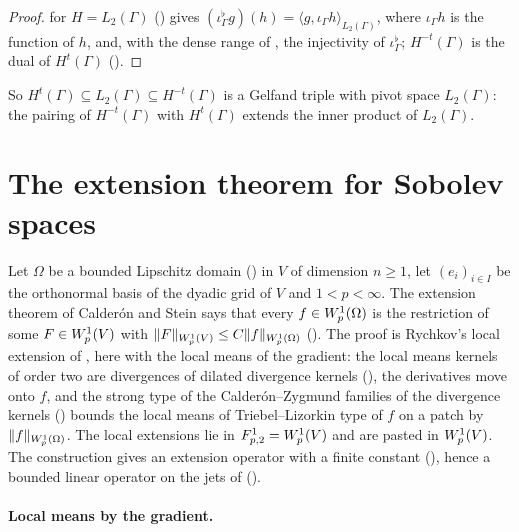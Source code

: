 \begin{proof}
\leanok
{} for $H = L_2(\Gamma)$ () gives
$(\iota_\Gamma^\flat g)(h) = \langle g, \iota_\Gamma h \rangle_{L_2(\Gamma)}$, where
$\iota_\Gamma h$ is the function of $h$, and, with the dense range of
, the injectivity of $\iota_\Gamma^\flat$; $H^{-t}(\Gamma)$
is the dual of $H^t(\Gamma)$ ().
\end{proof}

So $H^t(\Gamma) \subseteq L_2(\Gamma) \subseteq H^{-t}(\Gamma)$ is a Gelfand triple with pivot
space $L_2(\Gamma)$: the pairing of $H^{-t}(\Gamma)$ with $H^t(\Gamma)$ extends the inner product
of $L_2(\Gamma)$.

\section{The extension theorem for Sobolev spaces}
\label{sec:sobolev-extension}

Let $\Omega$ be a bounded Lipschitz domain () in $V$ of dimension
$n \geq 1$, let $(e_i)_{i \in I}$ be the orthonormal basis of the dyadic grid of $V$ and
$1 < p < \infty$. The extension theorem of Calder\'on and Stein \cite[Chapter VI]{SteinSingular}
says that every $f \in W^{1}_{p}(\Omega)$ is the restriction of some $F \in W^{1}_{p}(V)$ with
$\|F\|_{W^{1}_{p}(V)} \leq C \|f\|_{W^{1}_{p}(\Omega)}$ (). The
proof is Rychkov's local extension \cite{Rychkov} of , here with the
local means of the gradient: the local means kernels of order two are divergences of dilated
divergence kernels (), the derivatives move onto $f$, and the
strong type of the Calder\'on--Zygmund families of the divergence kernels
() bounds the local means of Triebel--Lizorkin type of $f$ on
a patch by $\|f\|_{W^{1}_{p}(\Omega)}$. The local extensions lie in
$F^{1}_{p,2} = W^{1}_{p}(V)$ and are pasted in $W^{1}_{p}(V)$. The construction gives an
extension operator with a finite constant (), hence a
bounded linear operator on the jets of 
().

\paragraph{Local means by the gradient.}

